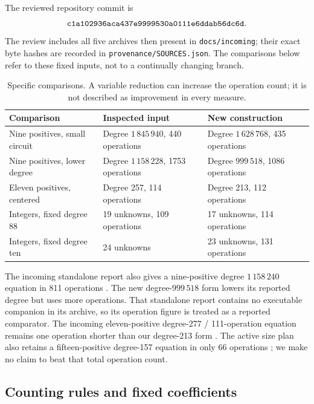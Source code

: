 \documentclass[11pt,a4paper]{article}
\newcommand{\file}[1]{\nolinkurl{#1}}
\theoremstyle{definition}
\theoremstyle{remark}
\numberwithin{equation}{section}
\begin{document}
The reviewed repository commit is
\[
 \texttt{c1a102936aca437e9999\allowbreak530a0111e6ddab56dc6d}.
\]
The review includes all five archives then present in \file{docs/incoming};
their exact byte hashes are recorded in \file{provenance/SOURCES.json}.
The comparisons below refer to these fixed inputs, not to a continually
changing branch.

\begin{table}[htbp]
\centering
\small
\begin{tabular}{p{43mm}p{49mm}p{48mm}}
\toprule
Comparison & Inspected input & New construction\\
\midrule
Nine positives, small circuit &
Degree \(1\,845\,940\), 440 operations \cite{repo} &
Degree \(1\,628\,768\), 435 operations\\
Nine positives, lower degree &
Degree \(1\,158\,228\), 1753 operations \cite{radical} &
Degree \(999\,518\), 1086 operations\\
Eleven positives, centered &
Degree 257, 114 operations \cite{joint} &
Degree 213, 112 operations\\
Integers, fixed degree 88 &
19 unknowns, 109 operations \cite{joint} &
17 unknowns, 114 operations\\
Integers, fixed degree ten &
24 unknowns \cite{budget} &
23 unknowns, 131 operations\\
\bottomrule
\end{tabular}
\caption{Specific comparisons. A variable reduction can increase the
operation count; it is not described as improvement in every measure.}
\label{tab:comparisons}
\end{table}

The incoming standalone report also gives a nine-positive degree
\(1\,158\,240\) equation in 811 operations \cite{reportincoming}.
The new degree-\(999\,518\) form lowers its reported degree but uses more
operations. That standalone report contains no executable companion in its
archive, so its operation figure is treated as a reported comparator.
The incoming eleven-positive degree-277 / 111-operation equation remains
one operation shorter than our degree-213 form \cite{joint}.
The active size plan also retains a fifteen-positive degree-157 equation
in only 66 operations \cite{repo}; we make no claim to beat that total
operation count.

\subsection{Counting rules and fixed coefficients}
\end{document}
